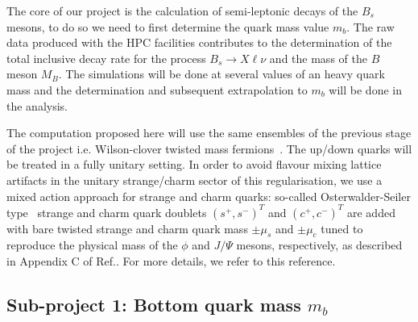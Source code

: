\label{sec:proj}
The core of our project is the calculation of semi-leptonic decays of the $B_s$ mesons,
to do so we need to first determine the quark mass value $m_b$.
The raw data produced with the HPC facilities
contributes to the determination of
the total inclusive decay rate for the process $B_s \to X\ell\nu$
and the mass of the $B$ meson $M_B$. The simulations
will be done at several values of an heavy quark mass and the determination and
subsequent extrapolation to $m_b$ will be done in the analysis.

The computation proposed here will use the same ensembles of the previous stage of the project
i.e. Wilson-clover twisted
mass fermions~\cite{Alexandrou:2018egz}. The up/down quarks will be treated
in a fully unitary setting. In order to avoid flavour mixing lattice artifacts
in the unitary strange/charm sector of this regularisation, we use a
mixed action approach for strange and charm quarks: so-called
Osterwalder-Seiler type~\cite{Frezzotti:2004wz} strange and charm quark doublets
$(s^+ , s^-)^T$ and $(c^+ , c^- )^T$ are added with bare
twisted strange and charm quark mass $\pm \mu_s$ and $\pm \mu_c$
tuned to reproduce the physical mass of the $\phi$ and $J/\Psi$
mesons, respectively, as described in Appendix C of
Ref.\cite{ExtendedTwistedMass:2022jpw}. For more details, we refer to
this reference.


\subsection{Sub-project 1: Bottom quark mass $m_b$}
\label{sec:mb}

